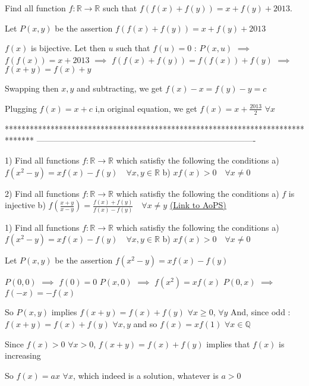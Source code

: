 \begin{solution}
	\begin{tcolorbox}Find all function $f: \mathbb{R}\to\mathbb{R}$ such that $f(f(x)+f(y))=x+f(y)+2013$.\end{tcolorbox}
Let $P(x,y)$ be the assertion $f(f(x)+f(y))=x+f(y)+2013$

$f(x)$ is bijective.
Let then $u$ such that $f(u)=0$ : 
$P(x,u)$ $\implies$ $f(f(x))=x+2013$ $\implies$ $f(f(x)+f(y))=f(f(x))+f(y)$ $\implies$ $f(x+y)=f(x)+y$

Swapping then $x,y$ and subtracting, we get $f(x)-x=f(y)-y=c$

Plugging $f(x)=x+c$ i,n original equation, we get $\boxed{f(x)=x+\frac{2013}2}$ $\forall x$
\end{solution}
*******************************************************************************
-------------------------------------------------------------------------------

\begin{problem}
	1) Find all functions $f:\mathbb{R}\to\mathbb{R}$ which satisfiy the following the conditions
a) $f(x^2-y)=xf(x)-f(y) \quad \forall x,y \in \mathbb{R}$
b) $xf(x)>0 \quad \forall x\neq 0$

2)  Find all functions $f:\mathbb{R}\to\mathbb{R}$ which satisfiy the following the conditions
a) $f$ is injective
b) $f\left(\frac{x+y}{x-y} \right) =\frac{f(x)+f(y)}{f(x)-f(y)} \quad \forall x\neq y$
	\flushright \href{https://artofproblemsolving.com/community/c6h563121}{(Link to AoPS)}
\end{problem}



\begin{solution}
	\begin{tcolorbox}1) Find all functions $f:\mathbb{R}\to\mathbb{R}$ which satisfiy the following the conditions
a) $f(x^2-y)=xf(x)-f(y) \quad \forall x,y \in \mathbb{R}$
b) $xf(x)>0 \quad \forall x\neq 0$\end{tcolorbox}
Let $P(x,y)$ be the assertion $f(x^2-y)=xf(x)-f(y)$

$P(0,0)$ $\implies$ $f(0)=0$
$P(x,0)$ $\implies$ $f(x^2)=xf(x)$
$P(0,x)$ $\implies$ $f(-x)=-f(x)$

So $P(x,y)$ implies $f(x+y)=f(x)+f(y)$ $\forall x\ge 0$, $\forall y$
And, since odd : $f(x+y)=f(x)+f(y)$ $\forall x,y$ and so $f(x)=xf(1)$ $\forall x\in\mathbb Q$

Since $f(x)>0$ $\forall x>0$, $f(x+y)=f(x)+f(y)$ implies that $f(x)$ is increasing

So $\boxed{f(x)=ax}$ $\forall x$, which indeed is a solution, whatever is $a>0$
\end{solution}



